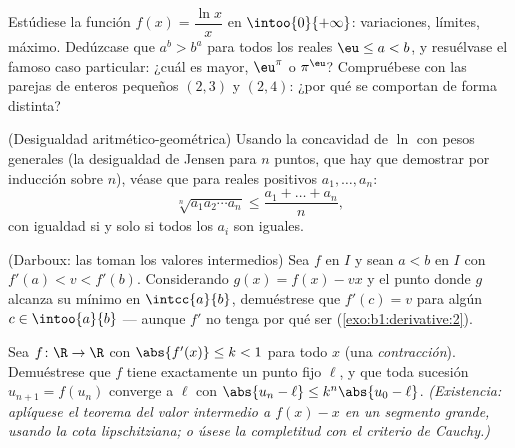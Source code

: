 \begin{exercise}[$\star\star$]\label{exo:b1:derivative:8}
Estúdiese la función $f(x) = \dfrac{\ln x}{x}$ en
$\intoo{0}{+\infty}$: variaciones, límites, máximo. Dedúzcase que
$a^b > b^a$ para todos los reales $\eu \leq a < b$, y resuélvase el
famoso caso particular: ¿cuál es mayor, $\eu^\pi$ o $\pi^\eu$?
Compruébese con las parejas de enteros pequeños $(2,3)$ y $(2,4)$:
¿por qué se comportan de forma distinta?
\end{exercise}

\begin{exercise}[$\star\star$]\label{exo:b1:derivative:9}
(Desigualdad aritmético-geométrica) Usando la concavidad de $\ln$ con
pesos generales (la desigualdad de Jensen para $n$ puntos, que hay que
demostrar por inducción sobre $n$), véase que para reales positivos
$a_1, \dots, a_n$:
\[
\sqrt[n]{a_1 a_2 \cdots a_n} \leq \frac{a_1 + \dots + a_n}{n},
\]
con igualdad si y solo si todos los $a_i$ son iguales.
\end{exercise}

\begin{exercise}[$\star\star\star$]\label{exo:b1:derivative:10}
(Darboux: las  toman los valores intermedios) Sea $f$
 en $I$ y sean $a < b$ en $I$ con $f'(a) < v < f'(b)$.
Considerando $g(x) = f(x) - vx$ y el punto donde $g$ alcanza su mínimo
en $\intcc{a}{b}$, demuéstrese que $f'(c) = v$ para algún
$c \in \intoo{a}{b}$ --- aunque $f'$ no tenga por qué ser 
(\cref{exo:b1:derivative:2}).
\end{exercise}

\begin{exercise}[$\star\star\star$]\label{exo:b1:derivative:11}
Sea $f \colon \R \to \R$  con $\abs{f'(x)} \leq k < 1$ para
todo $x$ (una \emph{contracción}). Demuéstrese que $f$ tiene
exactamente un punto fijo $\ell$, y que toda sucesión
$u_{n+1} = f(u_n)$ converge a $\ell$ con
$\abs{u_n - \ell} \leq k^n\abs{u_0 - \ell}$. \emph{(Existencia:
aplíquese el teorema del valor intermedio a $f(x) - x$ en un segmento
grande, usando la cota lipschitziana; o úsese la completitud con el
criterio de Cauchy.)}
\end{exercise}

